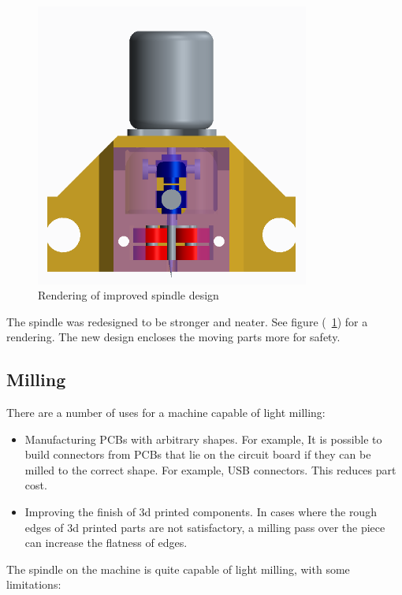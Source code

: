 \begin{figure}[ht!]
\centering
\includegraphics[width=90mm]{resources/spindle.png}
\caption{Rendering of improved spindle design}
\label{spindle}
\end{figure}

The spindle was redesigned to be stronger and neater. See figure (~\ref{spindle}) for a rendering.
The new design encloses the moving parts more for safety.

\subsection{Milling}
There are a number of uses for a machine capable of light milling:

\begin{itemize} \itemsep0em
	\item	Manufacturing PCBs with arbitrary shapes. For example, It is possible to build connectors from PCBs that lie on the circuit board if they can be milled to the correct shape.
			For example, USB connectors. This reduces part cost.
	\item	Improving the finish of 3d printed components. In cases where the rough edges of 3d printed parts are not satisfactory, a milling pass over the piece can increase the flatness
			of edges.
	
\end{itemize}

The spindle on the machine is quite capable of light milling, with some limitations:

